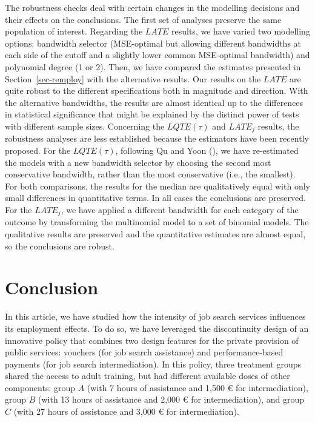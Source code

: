 \documentclass[
  11pt]{article}
\begin{document}
The robustness checks deal with certain changes in the modelling
decisions and their effects on the conclusions. The first set of
analyses preserve the same population of interest. Regarding the
\(LATE\) results, we have varied two modelling options: bandwidth
selector (MSE-optimal but allowing different bandwidths at each side of
the cutoff and a slightly lower common MSE-optimal bandwidth) and
polynomial degree (1 or 2). Then, we have compared the estimates
presented in Section~\ref{sec-remploy} with the alternative results. Our
results on the \(LATE\) are quite robust to the different specifications
both in magnitude and direction. With the alternative bandwidths, the
results are almost identical up to the differences in statistical
significance that might be explained by the distinct power of tests with
different sample sizes. Concerning the \(LQTE(\tau)\) and \(LATE_j\)
results, the robustness analyses are less established because the
estimators have been recently proposed. For the \(LQTE(\tau)\),
following Qu and Yoon (), we have
re-estimated the models with a new bandwidth selector by choosing the
second most conservative bandwidth, rather than the most conservative
(i.e., the smallest). For both comparisons, the results for the median
are qualitatively equal with only small differences in quantitative
terms. In all cases the conclusions are preserved. For the \(LATE_j\),
we have applied a different bandwidth for each category of the outcome
by transforming the multinomial model to a set of binomial models. The
qualitative results are preserved and the quantitative estimates are
almost equal, so the conclusions are robust.

\section{Conclusion}\label{sec-conc}

In this article, we have studied how the intensity of job search
services influences its employment effects. To do so, we have leveraged
the discontinuity design of an innovative policy that combines two
design features for the private provision of public services: vouchers
(for job search assistance) and performance-based payments (for job
search intermediation). In this policy, three treatment groups shared
the access to adult training, but had different available doses of other
components: group \(A\) (with 7 hours of assistance and 1,500 € for
intermediation), group \(B\) (with 13 hours of assistance and 2,000 €
for intermediation), and group \(C\) (with 27 hours of assistance and
3,000 € for intermediation).
\end{document}
